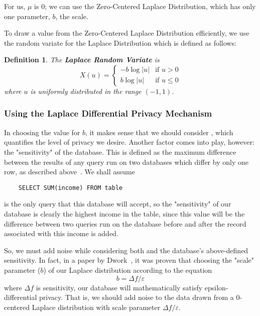 \documentclass[conference,11pt]{IEEEtran}
\newtheorem{definition}{Definition}
\begin{document}
For us, $\mu$ is 0; we can use the Zero-Centered Laplace Distribution, which has
only one parameter, $b$, the scale.

To draw a value from the Zero-Centered Laplace Distribution efficiently, we use
the random variate for the Laplace Distribution which is defined as follows:
\begin{mdframed}
    \begin{definition}\label{def:laplace-variate}
        The \textbf{Laplace Random Variate} is
        \begin{equation}
            X(u) =
                \begin{cases}
                    -b \log|u| & \text{if }u > 0\\
                    b \log|u| & \text{if }u \leq 0
                \end{cases}
        \end{equation}
        where $u$ is uniformly distributed in the range $(-1, 1)$.
    \end{definition}
\end{mdframed}

\subsubsection{Using the Laplace Differential Privacy Mechanism}\label{sec:using-laplace-dp}
In choosing the value for $b$, it makes sense that we should consider
\textepsilon, which quantifies the level of privacy we desire. Another factor
comes into play, however: the "sensitivity" of the database. This is defined as
the maximum difference between the results of any query run on two databases
which differ by only one row, as described above~\cite{Atockar:2014}. We shall
assume
\begin{verbatim}
    SELECT SUM(income) FROM table
\end{verbatim}
is the only query that this database will accept, so the "sensitivity" of our
database is clearly the highest income in the table, since this value will be
the difference between two queries run on the database before and after the
record associated with this income is added.

So, we must add noise while considering both {\textepsilon} and the database's
above-defined sensitivity. In fact, in a paper by
Dwork~\cite{Dwork:2011:private-data-analysis}, it was proven that choosing the
"scale" parameter ($b$) of our Laplace distribution according to the equation
\begin{equation}
    b = {\Delta}f/\varepsilon
\end{equation}
where ${\Delta}f$ is sensitivity, our database will mathematically satisfy
epsilon-differential privacy. That is, we should add noise to the data drawn
from a 0-centered Laplace distribution with scale parameter
${\Delta}f/\varepsilon$.
\end{document}
